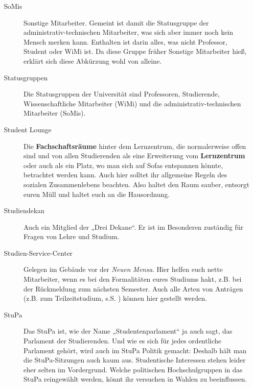 \begin{description}
\item[SoMis] Sonstige Mitarbeiter. Gemeint ist damit die Statusgruppe
der administrativ-technischen Mitarbeiter, was sich aber immer noch
kein Mensch merken kann. Enthalten ist darin alles, was nicht
Professor, Student oder WiMi ist. Da diese Gruppe früher Sonstige
Mitarbeiter hieß, erklärt sich diese Abkürzung wohl von alleine.


\item[Statusgruppen] Die Statusgruppen der Universität sind
Professoren, Studierende, Wissenschaftliche Mitarbeiter (WiMi) und die
administrativ-technischen Mitarbeiter (SoMis).


\item[Student Lounge] Die \textbf{Fachschaftsräume} hinter dem Lernzentrum, die
normalerweise offen sind und von allen Studierenden als eine Erweiterung vom
\textbf{Lernzentrum} oder auch als ein Platz, wo man sich auf Sofas entspannen
könnte, betrachtet werden kann. Auch hier solltet ihr allgemeine Regeln des sozialen Zusammenlebens beachten.
Also haltet den Raum sauber, entsorgt euren Müll und haltet euch an die Hausordnung.


\item[Studiendekan] Auch ein Mitglied der „Drei Dekane“. Er ist im
Besonderen zuständig für Fragen von Lehre und Studium.


\item[Studien-Service-Center] Gelegen im Gebäude vor der \textit{Neuen
Mensa}. Hier helfen euch nette Mitarbeiter, wenn es bei den
Formalitäten eures Studiums hakt, z.B. bei der Rückmeldung zum
nächsten Semester. Auch alle Arten von Anträgen (z.B. zum
Teilzeitstudium, s.S. \pageref{teilzeitstudium}) können hier gestellt
werden.



\item[StuPa] Das StuPa ist, wie der Name „Studentenparlament“ ja auch
sagt, das Parlament der Studierenden. Und wie es sich für jedes
ordentliche Parlament gehört, wird auch im StuPa Politik gemacht:
Deshalb hält man die StuPa-Sitzungen auch kaum aus. Studentische
Interessen stehen leider eher selten im Vordergrund. Welche
politischen Hochschulgruppen in das StuPa reingewählt werden, könnt
ihr versuchen in Wahlen zu beeinflussen.



\end{description}
